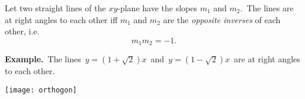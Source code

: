 \documentclass[12pt]{article}
\begin{document}
Let two straight lines of the $xy$-plane have the slopes $m_1$ and $m_2$. \,The lines are at right angles to each other iff $m_1$ and $m_2$ are the {\em opposite inverses} of each other, i.e.  
                             \[m_1m_2 = -1.\]

\textbf{Example.} \,The lines \,$y = (1+\sqrt{2})x$\, and \,$y = (1-\sqrt{2})x$\, are at right angles to each other.
\begin{center}
\texttt{[image: orthogon]}
\end{center}
\end{document}
